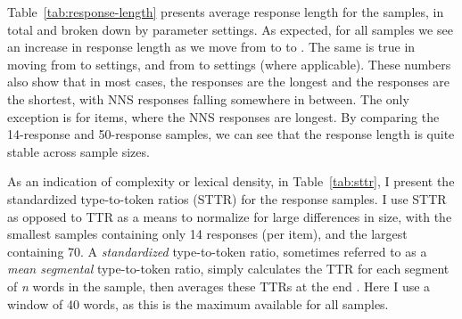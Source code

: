 Table~\ref{tab:response-length} presents average response length for the samples, in total and broken down by parameter settings. As expected, for all samples we see an increase in response length as we move from  to  to . The same is true in moving from  to  settings, and from  to  settings (where applicable). These numbers also show that in most cases, the  responses are the longest and the  responses are the shortest, with NNS responses falling somewhere in between. The only exception is for  items, where the NNS responses are longest. By comparing the 14-response and 50-response  samples, we can see that the response length is quite stable across sample sizes.

As an indication of complexity or lexical density, in Table~\ref{tab:sttr}, I present the standardized type-to-token ratios (STTR) for the response samples. I use STTR as opposed to TTR as a means to normalize for large differences in size, with the smallest samples containing only 14 responses (per item), and the largest containing 70. A \textit{standardized} type-to-token ratio, sometimes referred to as a \textit{mean segmental} type-to-token ratio, simply calculates the TTR for each segment of \textit{n} words in the sample, then averages these TTRs at the end \cite{johnson1944studies, richards2000accommodation}. Here I use a window of 40 words, as this is the maximum available for all samples. 

